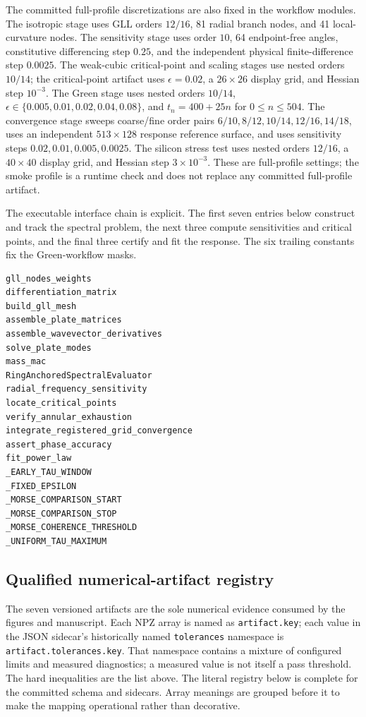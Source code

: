 The committed full-profile discretizations are also fixed in the workflow
modules.  The isotropic stage uses GLL orders \(12/16\), 81 radial branch
nodes, and 41 local-curvature nodes.  The sensitivity stage uses order \(10\),
64 endpoint-free angles, constitutive differencing step \(0.25\), and the
independent physical finite-difference step \(0.0025\).  The weak-cubic
critical-point and scaling stages use nested orders \(10/14\); the
critical-point artifact uses \(\epsilon=0.02\), a \(26\times26\) display
grid, and Hessian step \(10^{-3}\).  The Green stage uses nested orders
\(10/14\), \(\epsilon\in\{0.005,0.01,0.02,0.04,0.08\}\), and
\(t_n=400+25n\) for \(0\leq n\leq504\).  The convergence stage sweeps
coarse/fine order pairs \(6/10,8/12,10/14,12/16,14/18\), uses an independent
\(513\times128\) response reference surface, and uses sensitivity steps
\(0.02,0.01,0.005,0.0025\).  The silicon stress test uses nested orders
\(12/16\), a \(40\times40\) display grid, and Hessian step
\(3\times10^{-3}\).  These are full-profile settings; the smoke profile is a
runtime check and does not replace any committed full-profile artifact.

The executable interface chain is explicit.  The first seven entries below
construct and track the spectral problem, the next three compute sensitivities
and critical points, and the final three certify and fit the response.  The
six trailing constants fix the Green-workflow masks.
{\footnotesize
\begin{verbatim}
gll_nodes_weights
differentiation_matrix
build_gll_mesh
assemble_plate_matrices
assemble_wavevector_derivatives
solve_plate_modes
mass_mac
RingAnchoredSpectralEvaluator
radial_frequency_sensitivity
locate_critical_points
verify_annular_exhaustion
integrate_registered_grid_convergence
assert_phase_accuracy
fit_power_law
_EARLY_TAU_WINDOW
_FIXED_EPSILON
_MORSE_COMPARISON_START
_MORSE_COMPARISON_STOP
_MORSE_COHERENCE_THRESHOLD
_UNIFORM_TAU_MAXIMUM
\end{verbatim}
}

\subsection{Qualified numerical-artifact registry}

The seven versioned artifacts are the sole numerical evidence consumed by
the figures and manuscript.  Each NPZ array is named as
\texttt{artifact.key}; each value in the JSON sidecar's historically named
\texttt{tolerances} namespace is
\texttt{artifact.tolerances.key}.  That namespace contains a mixture of
configured limits and measured diagnostics; a measured value is not itself a
pass threshold.  The hard inequalities are the list above.  The literal
registry below is complete for the committed schema and sidecars.  Array
meanings are grouped before it to make the mapping operational rather than
decorative.

